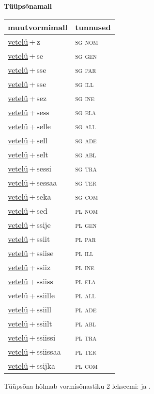 
\vspace{1.8em}
\begin{minipage}{\textwidth}
\textbf{Tüüpsõnamall \,}\\

\begin{sideways}
\begin{tabular}{l l}
muutvormimall & tunnused \\
\hline
\underline{vetelü}\,+\,z & \textsc{ sg nom } \\
\underline{vetelü}\,+\,se & \textsc{ sg gen } \\
\underline{vetelü}\,+\,sse & \textsc{ sg par } \\
\underline{vetelü}\,+\,sse & \textsc{ sg ill } \\
\underline{vetelü}\,+\,sez & \textsc{ sg ine } \\
\underline{vetelü}\,+\,sess & \textsc{ sg ela } \\
\underline{vetelü}\,+\,selle & \textsc{ sg all } \\
\underline{vetelü}\,+\,sell & \textsc{ sg ade } \\
\underline{vetelü}\,+\,selt & \textsc{ sg abl } \\
\underline{vetelü}\,+\,sessi & \textsc{ sg tra } \\
\underline{vetelü}\,+\,sessaa & \textsc{ sg ter } \\
\underline{vetelü}\,+\,seka & \textsc{ sg com } \\
\underline{vetelü}\,+\,sed & \textsc{ pl nom } \\
\underline{vetelü}\,+\,ssije & \textsc{ pl gen } \\
\underline{vetelü}\,+\,ssiit & \textsc{ pl par } \\
\underline{vetelü}\,+\,ssiise & \textsc{ pl ill } \\
\underline{vetelü}\,+\,ssiiz & \textsc{ pl ine } \\
\underline{vetelü}\,+\,ssiiss & \textsc{ pl ela } \\
\underline{vetelü}\,+\,ssiille & \textsc{ pl all } \\
\underline{vetelü}\,+\,ssiill & \textsc{ pl ade } \\
\underline{vetelü}\,+\,ssiilt & \textsc{ pl abl } \\
\underline{vetelü}\,+\,ssiissi & \textsc{ pl tra } \\
\underline{vetelü}\,+\,ssiissaa & \textsc{ pl ter } \\
\underline{vetelü}\,+\,ssijka & \textsc{ pl com } \\
\end{tabular}
\end{sideways}
\label{tab:tüüpsõnamall-vetelüz}

\end{minipage}

 
\vspace{1em}
\noindent Tüüpsõna hõlmab vormisõnastiku 2 lekseemi:  ja .
